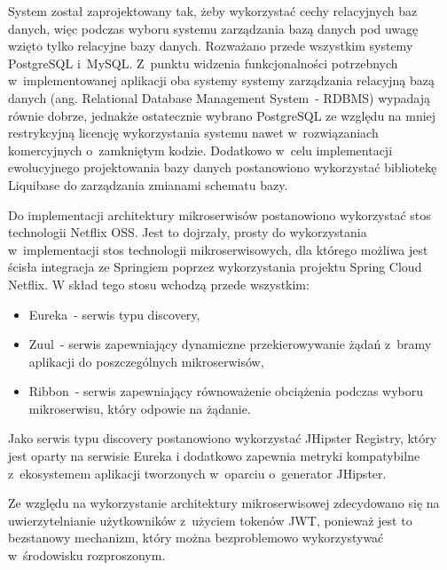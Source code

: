 \par
System został zaprojektowany tak, żeby wykorzystać cechy relacyjnych baz danych,
więc podczas wyboru systemu zarządzania bazą danych pod uwagę wzięto tylko relacyjne bazy danych.
Rozważano przede wszystkim systemy PostgreSQL\cite{tech:postgresql} i~MySQL\cite{tech:mysql}.
Z~punktu widzenia funkcjonalności potrzebnych w~implementowanej aplikacji oba systemy systemy zarządzania relacyjną bazą danych (ang. Relational Database Management System~- RDBMS) wypadają równie dobrze,
jednakże ostatecznie wybrano PostgreSQL ze względu na mniej restrykcyjną licencję wykorzystania systemu nawet w~rozwiązaniach komercyjnych o~zamkniętym kodzie.
Dodatkowo w~celu implementacji ewolucyjnego projektowania bazy danych\cite{url:evolutionary-database} postanowiono wykorzystać bibliotekę Liquibase\cite{tech:liquibase} do zarządzania zmianami schematu bazy.

\par
Do implementacji architektury mikroserwisów postanowiono wykorzystać stos technologii Netflix OSS\cite{tech:netflix-oss}.
Jest to dojrzały, prosty do wykorzystania w~implementacji stos technologii mikroserwisowych,
dla którego możliwa jest ścisła integracja ze Springiem poprzez wykorzystania projektu Spring Cloud Netflix\cite{tech:spring-cloud-netflix}.
W skład tego stosu wchodzą przede wszystkim:
\begin{itemize}
    \item Eureka\cite{tech:netflix-eureka}~- serwis typu discovery,
    \item Zuul\cite{tech:netflix-zuul}~- serwis zapewniający dynamiczne przekierowywanie żądań z~bramy aplikacji do poszczególnych mikroserwisów,
    \item Ribbon\cite{tech:netflix-ribbon}~- serwis zapewniający równoważenie obciążenia podczas wyboru mikroserwisu, który odpowie na żądanie.
\end{itemize}

\par
Jako serwis typu discovery postanowiono wykorzystać JHipster Registry\cite{tech:jhipster-registry}, który jest oparty na serwisie Eureka
i dodatkowo zapewnia metryki kompatybilne z~ekosystemem aplikacji tworzonych w~oparciu o~generator JHipster.

\par
Ze względu na wykorzystanie architektury mikroserwisowej zdecydowano się na uwierzytelnianie użytkowników z~użyciem tokenów JWT\cite{url:jwt},
ponieważ jest to bezstanowy mechanizm, który można bezproblemowo wykorzystywać w~środowisku rozproszonym.

